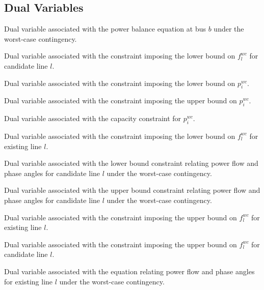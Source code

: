 \subsection{Dual Variables}
\begin{description}

\item[${\beta}_{b}$] Dual variable associated with the power balance equation at bus $b$ under the worst-case contingency.

\item[${\gamma}_{l}$] Dual variable associated with the constraint imposing the lower bound on ${f}^{wc}_{l}$ for candidate line $l$.

\item[${\zeta}_{i}$] Dual variable associated with the constraint imposing the lower bound on ${p}^{wc}_{i}$.

\item[${\lambda}_{i}$] Dual variable associated with the constraint imposing the upper bound on ${p}^{wc}_{i}$.

\item[${\mu}_{i}$] Dual variable associated with the capacity constraint for ${p}^{wc}_{i}$.

\item[${\xi}_{l}$] Dual variable associated with the constraint imposing the lower bound on ${f}^{wc}_{l}$ for existing line $l$.

\item[${\pi}_{l}$] Dual variable associated with the lower bound constraint relating power flow and phase angles for candidate line $l$ under the worst-case contingency.

\item[${\sigma}_{l}$] Dual variable associated with the upper bound constraint relating power flow and phase angles for candidate line $l$ under the worst-case contingency.

\item[${\phi}_{l}$] Dual variable associated with the constraint imposing the upper bound on ${f}^{wc}_{l}$ for existing line $l$.

\item[${\chi}_{l}$] Dual variable associated with the constraint imposing the upper bound on ${f}^{wc}_{l}$ for candidate line $l$.

\item[${\omega}_{l}$] Dual variable associated with the equation relating power flow and phase angles for existing line $l$ under the worst-case contingency.


\end{description}
